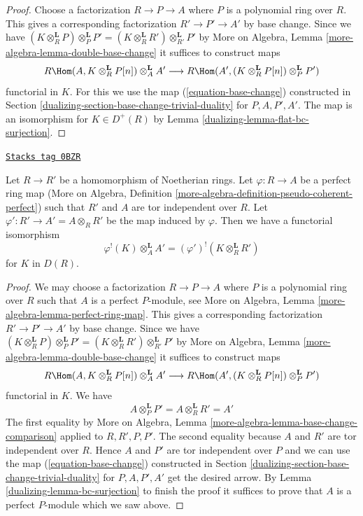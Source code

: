 \begin{proof}

Choose a factorization $R \to P \to A$ where $P$ is a polynomial ring over $R$.
This gives a corresponding factorization $R' \to P' \to A'$ by base change.
Since we have $(K \otimes_R^\mathbf{L} P) \otimes_P^\mathbf{L} P' =
(K \otimes_R^\mathbf{L} R') \otimes_{R'}^\mathbf{L} P'$
by More on Algebra, Lemma \ref{more-algebra-lemma-double-base-change}
it suffices to construct maps
$$
R\Hom(A, K \otimes_R^\mathbf{L} P[n]) \otimes_A^\mathbf{L} A'
\longrightarrow
R\Hom(A', (K \otimes_R^\mathbf{L} P[n]) \otimes_P^\mathbf{L} P')
$$
functorial in $K$. For this we use the map (\ref{equation-base-change})
constructed in Section \ref{dualizing-section-base-change-trivial-duality}
for $P, A, P', A'$.
The map is an isomorphism for $K \in D^+(R)$ by
Lemma \ref{dualizing-lemma-flat-bc-surjection}.
\end{proof}

\begin{lemma}[Bc]
\label{dualizing-lemma-bc}
\href{https://stacks.math.columbia.edu/tag/0BZR}{\texttt{Stacks tag 0BZR}}

Let $R \to R'$ be a homomorphism of Noetherian rings.
Let $\varphi : R \to A$ be a perfect ring map
(More on Algebra, Definition
\ref{more-algebra-definition-pseudo-coherent-perfect})
such that $R'$ and $A$ are tor independent over $R$.
Let $\varphi' : R' \to A' = A \otimes_R R'$ be the map induced by $\varphi$.
Then we have a functorial isomorphism
$$
\varphi^!(K) \otimes_A^\mathbf{L} A' =
(\varphi')^!(K \otimes_R^\mathbf{L} R')
$$
for $K$ in $D(R)$.
\end{lemma}

\begin{proof}

We may choose a factorization $R \to P \to A$ where $P$
is a polynomial ring over $R$ such that $A$ is a perfect $P$-module, see
More on Algebra, Lemma \ref{more-algebra-lemma-perfect-ring-map}.
This gives a corresponding factorization $R' \to P' \to A'$ by base change.
Since we have $(K \otimes_R^\mathbf{L} P) \otimes_P^\mathbf{L} P' =
(K \otimes_R^\mathbf{L} R') \otimes_{R'}^\mathbf{L} P'$
by More on Algebra, Lemma \ref{more-algebra-lemma-double-base-change}
it suffices to construct maps
$$
R\Hom(A, K \otimes_R^\mathbf{L} P[n]) \otimes_A^\mathbf{L} A'
\longrightarrow
R\Hom(A', (K \otimes_R^\mathbf{L} P[n]) \otimes_P^\mathbf{L} P')
$$
functorial in $K$. We have
$$
A \otimes_P^\mathbf{L} P' = A \otimes_R^\mathbf{L} R' = A'
$$
The first equality by
More on Algebra, Lemma \ref{more-algebra-lemma-base-change-comparison}
applied to $R, R', P, P'$. The second equality because
$A$ and $R'$ are tor independent over $R$. Hence $A$ and $P'$ are
tor independent over $P$ and we can use the map (\ref{equation-base-change})
constructed in Section \ref{dualizing-section-base-change-trivial-duality} for
$P, A, P', A'$
get the desired arrow. By Lemma \ref{dualizing-lemma-bc-surjection}
to finish the proof it suffices to prove that $A$ is a perfect $P$-module
which we saw above.
\end{proof}

